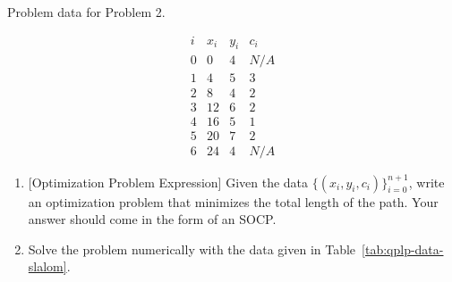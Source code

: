\begin{table}[h]
\caption{Problem data for Problem 2.}
\begin{center}
\[
\begin{array}{c|ccc}
i & x_i & y_i & c_i \\\hline
0 & 0 & 4 & N/A \\
1 & 4 & 5 & 3 \\
2 & 8 & 4 & 2 \\
3 & 12 & 6 & 2 \\
4 & 16 & 5 & 1 \\
5 & 20 & 7 & 2 \\
6 & 24 & 4 & N/A
\end{array}
\]
\end{center}
\label{tab:qplp-data-slalom}
\end{table}
\begin{enumerate}
\item {[Optimization Problem Expression]} Given the data $\{(x_i, y_i, c_i)\}_{i=0}^{n+1}$, write an optimization problem that minimizes the total length of the path. Your answer should come in the form of an SOCP. 
\newline
\newline
\newline
\newline
\sol{}
\newline
\item Solve the problem numerically with the data given in Table~\ref{tab:qplp-data-slalom}.
\newline
\sol{}
\newline
\end{enumerate}